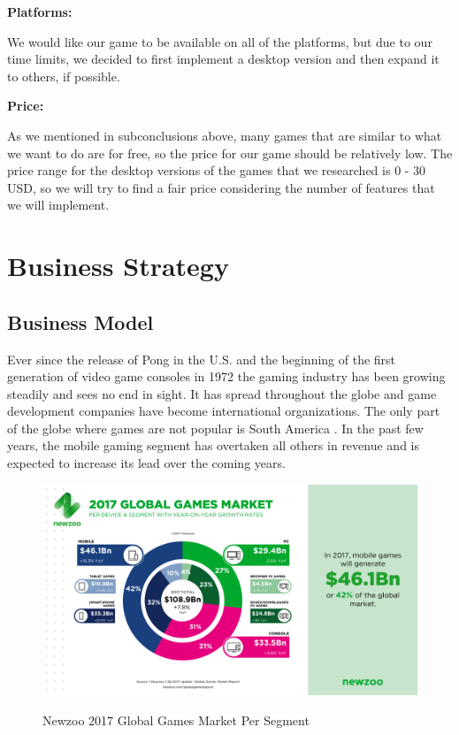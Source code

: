 \documentclass[12p]{article}
\begin{document}
\textbf{Platforms:}

We would like our game to be available on all of the platforms, but due to our time limits, we decided to first implement a desktop version and then expand it to others, if possible.

\textbf{Price:}

As we mentioned in subconclusions above, many games that are similar to what we want to do are for free, so the price for our game should be relatively low. The price range for the desktop versions of the games that we researched is 0 - 30 USD, so we will try to find a fair price considering the number of features that we will implement.


\newpage
\section{Business Strategy} \label{MarketAnalysis}

\subsection{Business Model} 
Ever since the release of Pong \cite{Pong} in the U.S. and the beginning of the first generation of video game consoles in 1972 the gaming industry has been growing steadily and sees no end in sight. It has spread throughout the globe and game development companies have become international organizations. The only part of the globe where games are not popular is South America \cite{GamesMarketRevenue}. In the past few years, the mobile gaming segment has overtaken all others in revenue and is expected to increase its lead over the coming years.

\begin{figure}[ht]
  \center
  \includegraphics[width=1\textwidth]{BusinessStrategy/Newzoo_2017_Global_Games_Market_Per_Segment_April_2017}
  \label{Newzoo_2017_Global_Games_Market_Per_Segment_April_2017}
  \caption{Newzoo 2017 Global Games Market Per Segment \cite{NezooScreenshot}}
\end{figure}
\end{document}
